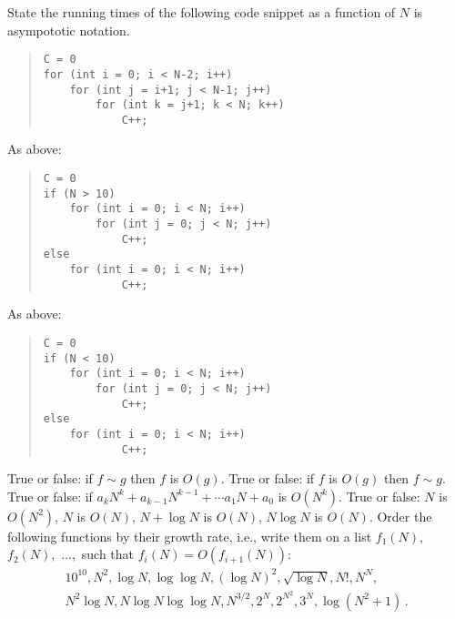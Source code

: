 \documentclass{tufte-handout}
\begin{document}
\begin{ExerciseList}
  \Exercise State the running times of the following code snippet as
  a function of $N$ is asympototic notation.
  \begin{quote}
\begin{lstlisting}[basicstyle=\ttfamily\small]
C = 0
for (int i = 0; i < N-2; i++)
    for (int j = i+1; j < N-1; j++)
        for (int k = j+1; k < N; k++)
            C++;
\end{lstlisting}
\end{quote} 

  \Exercise As above:
  \begin{quote}
\begin{lstlisting}[basicstyle=\ttfamily\small]
C = 0
if (N > 10)
    for (int i = 0; i < N; i++)
        for (int j = 0; j < N; j++)
            C++;
else 
    for (int i = 0; i < N; i++)
            C++;
\end{lstlisting}
\end{quote} 

  \Exercise As above:
  \begin{quote}
\begin{lstlisting}[basicstyle=\ttfamily\small]
C = 0
if (N < 10)
    for (int i = 0; i < N; i++)
        for (int j = 0; j < N; j++)
            C++;
else 
    for (int i = 0; i < N; i++)
            C++;
\end{lstlisting}
\end{quote} 

\Exercise True or false: if $f\sim g$ then $f$ is $O(g)$.
\Exercise True or false: if $f$ is $O(g)$ then $f\sim g$.
\Exercise True or false: if $a_kN^k +a_{k-1}N^{k-1} + \cdots a_1 N +
a_0$ is $O(N^k)$.
\Exercise True or false: $N$ is $O(N^2)$, $N$ is $O(N)$, $N+\log
N $ is $O(N)$, $N\log N $ is $O(N)$. \Exercise Order the following
functions by their growth rate, i.e., write them on a list $f_1(N),$
$f_2(N),$ $\ldots,$ such that $f_i(N)=O(f_{i+1}(N))$:
    \begin{multline*}
      10^{10}, N^2, \log N, \log\log N, (\log N)^2, \sqrt{\log N}, N!,
      N^N,\\ N^2\log N, N\log N\log\log N, N^{3/2}, 2^N, 2^{N^2}, 3^N,
      \log (N^2+1)\,.
    \end{multline*}
\end{ExerciseList}
\end{document}
